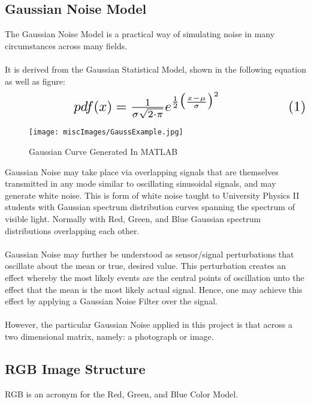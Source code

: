 \documentclass{article}
\begin{document}
\subsection*{Gaussian Noise Model}
\noindent
The Gaussian Noise Model is a practical way of simulating noise in many circumstances across many fields.\\
\hfill \\
It is derived from the Gaussian Statistical Model, shown in the following equation as well as figure:\\
\[ \scalebox{2}{$ $\qquad \qquad \quad$
pdf(x) = \frac{1}{\sigma \sqrt{2 \cdot \pi}} e^{\frac{1}{2}\big(\frac{x-\mu}{\sigma}\big)^{2}} $\qquad \qquad \quad (1)$
$}\]

\begin{figure}[h!]
\texttt{[image: miscImages/GaussExample.jpg]}
\caption{Gaussian Curve Generated In MATLAB}
\end{figure}

\pagebreak
\noindent
Gaussian Noise may take place via overlapping signals that are themselves transmitted in any mode similar to
oscillating sinusoidal signals, and may generate white noise.  This is form of white noise taught to University 
Physics II students with Gaussian spectrum distribution curves spanning the spectrum of visible light.  Normally 
with Red, Green, and Blue Gaussian spectrum distributions overlapping each other.\\
\hfill \\
Gaussian Noise may further be understood as sensor/signal perturbations that oscillate about the mean or true,
desired value.  This perturbation creates an effect whereby the most likely events are the central points of oscillation
unto the effect that the mean is the most likely actual signal.  Hence, one may achieve this effect by applying a 
Gaussian Noise Filter over the signal.\\
\hfill \\
However, the particular Gaussian Noise applied in this project is that across a two dimensional matrix, namely: a
photograph or image.

\subsection*{RGB Image Structure}

RGB is an acronym for the Red, Green, and Blue Color Model.\\
\hfill \\
\end{document}
